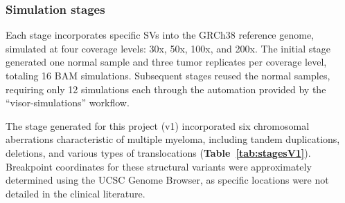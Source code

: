 \subsubsection{Simulation stages}

Each stage incorporates specific SVs into the GRCh38 reference genome, simulated 
at four coverage levels: 30x, 50x, 100x, and 200x. The initial stage generated 
one normal sample and three tumor replicates per coverage level, totaling 16 BAM 
simulations. Subsequent stages reused the normal samples, requiring only 12 
simulations each through the automation provided by the ``visor-simulations'' 
workflow. 

The stage generated for this project (v1) incorporated six chromosomal 
aberrations characteristic of multiple myeloma, including tandem duplications, 
deletions, and various types of translocations (\textbf{Table~\ref{tab:stagesV1}}). 
Breakpoint coordinates for these structural variants were approximately 
determined using the UCSC Genome Browser, as specific locations were not 
detailed in the clinical literature.

\begingroup
\vspace{0.35cm}

\footnotesize

